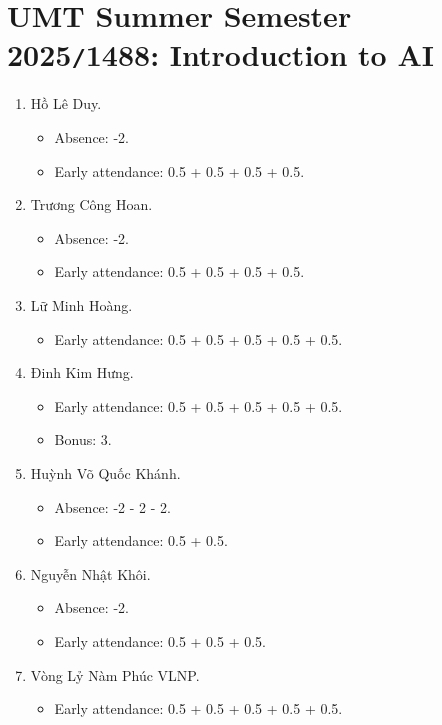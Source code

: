 \documentclass{article}
\begin{document}

\section{UMT Summer Semester 2025{\tt/}1488: Introduction to AI}

\begin{enumerate}
	\item {\sc Hồ Lê Duy.}
	\begin{itemize}
		\item Absence: -2.
		\item Early attendance: 0.5 + 0.5 + 0.5 + 0.5.
	\end{itemize}
	\item {\sc Trương Công Hoan.}
	\begin{itemize}
		\item Absence: -2.
		\item Early attendance: 0.5 + 0.5 + 0.5 + 0.5.
	\end{itemize}
	\item {\sc Lữ Minh Hoàng.}
	\begin{itemize}
		\item Early attendance: 0.5 + 0.5 + 0.5 + 0.5 + 0.5.
	\end{itemize}
	\item {\sc Đinh Kim Hưng.}
	\begin{itemize}
		\item Early attendance: 0.5 + 0.5 + 0.5 + 0.5 + 0.5.
		\item Bonus: 3.
	\end{itemize}
	\item {\sc Huỳnh Võ Quốc Khánh.}
	\begin{itemize}
		\item Absence: -2 - 2 - 2.
		\item Early attendance: 0.5 + 0.5.
	\end{itemize}
	\item {\sc Nguyễn Nhật Khôi.}
	\begin{itemize}
		\item Absence: -2.
		\item Early attendance: 0.5 + 0.5 + 0.5.
	\end{itemize}
	\item {\sc Vòng Lỷ Nàm Phúc {VLNP}.}
	\begin{itemize}
		\item Early attendance: 0.5 + 0.5 + 0.5 + 0.5 + 0.5.

\end{itemize}
\end{enumerate}
\end{document}
